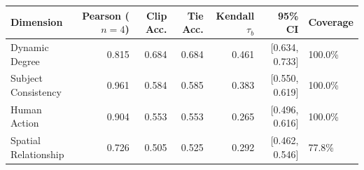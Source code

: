 \begin{tabular}{lrrrrrl}
\toprule
Dimension & Pearson ($n=4$) & Clip Acc. & Tie Acc. & Kendall $\tau_b$ & 95\% CI & Coverage \\
\midrule
Dynamic Degree & 0.815 & 0.684 & 0.684 & 0.461 & [0.634, 0.733] & 100.0\% \\
Subject Consistency & 0.961 & 0.584 & 0.585 & 0.383 & [0.550, 0.619] & 100.0\% \\
Human Action & 0.904 & 0.553 & 0.553 & 0.265 & [0.496, 0.616] & 100.0\% \\
Spatial Relationship & 0.726 & 0.505 & 0.525 & 0.292 & [0.462, 0.546] & 77.8\% \\
\bottomrule
\end{tabular}
